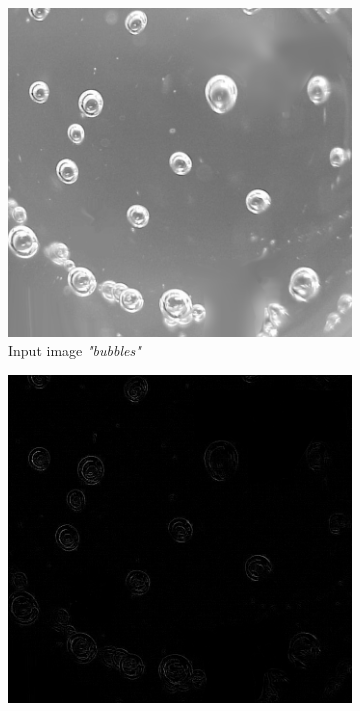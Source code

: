 \documentclass{article}
\begin{document}
\begin{figure}[H]
    \centering
    \caption{Results of testing \textit{IPfilter()}}
    \label{fig:filterResults}
    \begin{subfigure}[t]{0.32\textwidth}
        \centering
        \includegraphics[width=\textwidth]{Assignment_1/input_images/bubbles.png}
        \caption{Input image \textit{"bubbles"}}
        \label{fig:orginalBubbles}
    \end{subfigure}
    \hfill
    \begin{subfigure}[t]{0.32\textwidth}
        \centering
        \includegraphics[width=\textwidth]{Assignment_1/output_images/filter_kevin.png}

\end{subfigure}
\end{figure}
\end{document}
